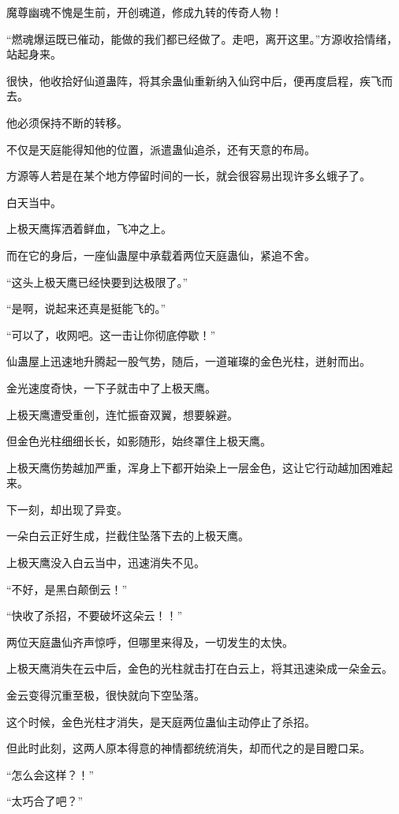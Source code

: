 \begin{this_body}
魔尊幽魂不愧是生前，开创魂道，修成九转的传奇人物！

“燃魂爆运既已催动，能做的我们都已经做了。走吧，离开这里。”方源收拾情绪，站起身来。

很快，他收拾好仙道蛊阵，将其余蛊仙重新纳入仙窍中后，便再度启程，疾飞而去。

他必须保持不断的转移。

不仅是天庭能得知他的位置，派遣蛊仙追杀，还有天意的布局。

方源等人若是在某个地方停留时间的一长，就会很容易出现许多幺蛾子了。

白天当中。

上极天鹰挥洒着鲜血，飞冲之上。

而在它的身后，一座仙蛊屋中承载着两位天庭蛊仙，紧追不舍。

“这头上极天鹰已经快要到达极限了。”

“是啊，说起来还真是挺能飞的。”

“可以了，收网吧。这一击让你彻底停歇！”

仙蛊屋上迅速地升腾起一股气势，随后，一道璀璨的金色光柱，迸射而出。

金光速度奇快，一下子就击中了上极天鹰。

上极天鹰遭受重创，连忙振奋双翼，想要躲避。

但金色光柱细细长长，如影随形，始终罩住上极天鹰。

上极天鹰伤势越加严重，浑身上下都开始染上一层金色，这让它行动越加困难起来。

下一刻，却出现了异变。

一朵白云正好生成，拦截住坠落下去的上极天鹰。

上极天鹰没入白云当中，迅速消失不见。

“不好，是黑白颠倒云！”

“快收了杀招，不要破坏这朵云！！”

两位天庭蛊仙齐声惊呼，但哪里来得及，一切发生的太快。

上极天鹰消失在云中后，金色的光柱就击打在白云上，将其迅速染成一朵金云。

金云变得沉重至极，很快就向下空坠落。

这个时候，金色光柱才消失，是天庭两位蛊仙主动停止了杀招。

但此时此刻，这两人原本得意的神情都统统消失，却而代之的是目瞪口呆。

“怎么会这样？！”

“太巧合了吧？”


\end{this_body}
